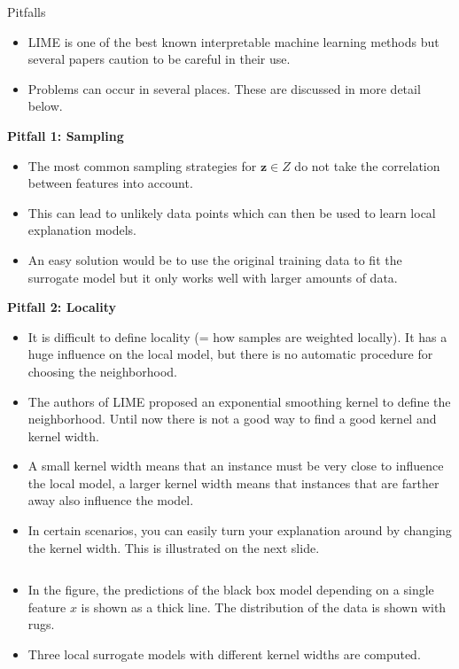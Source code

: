 \documentclass[11pt,compress,t,notes=noshow, xcolor=table]{beamer}
\newcommand{\zv}{\mathbf{z}}
\begin{document}
\begin{vbframe}{Pitfalls}
  \begin{itemize}
  	\item LIME is one of the best known interpretable machine learning methods but several papers caution to be careful in their use. 
  	\item Problems can occur in several places. These are discussed in more detail below. 
  \end{itemize}
	\textbf{Pitfall 1: Sampling}
	\begin{itemize}
	  \item The most common sampling strategies for $\zv \in Z$ do not take the correlation between features into account. 
      \item This can lead to unlikely data points which can then be used to learn local explanation models.
      \item An easy solution would be to use the original training data to fit the surrogate model but it only works well with larger amounts of data. 
    \end{itemize}
\framebreak
	\textbf{Pitfall 2: Locality}
	\begin{itemize} 
     \item It is difficult to define locality (= how samples are weighted locally). It has a huge influence on the local model, but there is no automatic procedure for choosing the neighborhood. 
     \item The authors of LIME proposed an exponential smoothing kernel to define the neighborhood. 
     Until now there is not a good way to find a good kernel and kernel width. 
     \item A small kernel width means that an instance must be very close to influence the local model, a larger kernel width means that instances that are farther away also influence the model. 
     \item In certain scenarios, you can easily turn your explanation around by changing the kernel width. This is illustrated on the next slide. 
   \end{itemize}
	\framebreak
  \begin{columns}
  \begin{column}{0.47\textwidth}
  \begin{itemize}
    \item In the figure, the predictions of the black box model depending on a single feature $x$ is shown as a thick line. The distribution of the data is shown with rugs.
    \item Three local surrogate models with different kernel widths are computed. 

\end{itemize}
\end{column}
\end{columns}
\end{vbframe}
\end{document}
